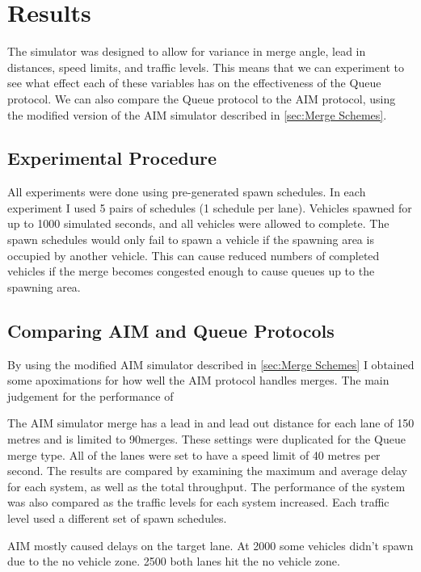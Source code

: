 \chapter{Results}
\label{cha:Results}
The simulator was designed to allow for variance in merge angle, lead in distances, speed limits, and traffic levels. This means that we can experiment to see what effect each of these variables has on the effectiveness of the Queue protocol. We can also compare the Queue protocol to the AIM protocol, using the modified version of the AIM simulator described in \ref{sec:Merge Schemes}.

\section{Experimental Procedure}
\label{sec:Experimental Procedure}
All experiments were done using pre-generated spawn schedules. In each experiment I used 5 pairs of schedules (1 schedule per lane). 
Vehicles spawned for up to 1000 simulated seconds, and all vehicles were allowed to complete. The spawn schedules would only fail to spawn a vehicle if the spawning area is occupied by another vehicle. This can cause reduced numbers of completed vehicles if the merge becomes congested enough to cause queues up to the spawning area.

\section{Comparing AIM and Queue Protocols}
\label{sec:Comparing AIM and Queue Protocols}
By using the modified AIM simulator described in \ref{sec:Merge Schemes} I obtained some apoximations for how well the AIM protocol handles merges. The main judgement for the performance of 

The AIM simulator merge has a lead in and lead out distance for each lane of 150 metres and is limited to 90\degree merges. These settings were duplicated for the Queue merge type. All of the lanes were set to have a speed limit of 40 metres per second. The results are compared by examining the maximum and average delay for each system, as well as the total throughput. The performance of the system was also compared as the traffic levels for each system increased. Each traffic level used a different set of spawn schedules.

AIM mostly caused delays on the target lane. At 2000 some vehicles didn't spawn due to the no vehicle zone. 2500 both lanes hit the no vehicle zone.

